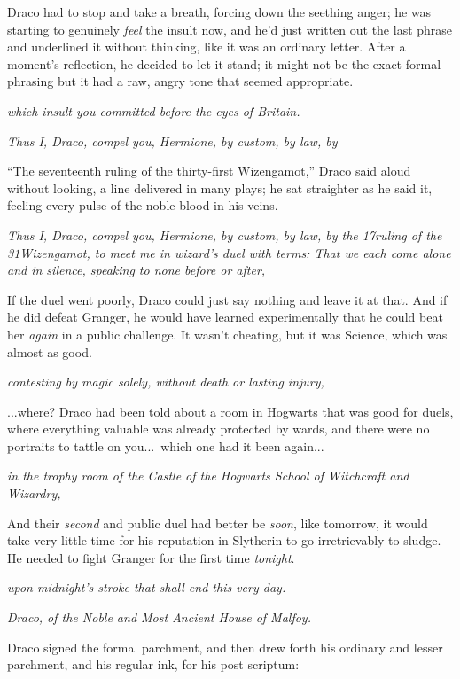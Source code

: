 Draco had to stop and take a breath, forcing down the seething
anger; he was starting to genuinely \emph{feel} the insult now, and
he’d just written out the last phrase and underlined it without
thinking, like it was an ordinary letter. After a moment’s
reflection, he decided to let it stand; it might not be the exact
formal phrasing but it had a raw, angry tone that seemed
appropriate.

\emph{which insult you committed before the eyes of
Britain.}

\emph{Thus I, Draco, compel you, Hermione, by custom, by law,
by}

“The seventeenth ruling of the thirty-first Wizengamot,” Draco
said aloud without looking, a line delivered in many plays; he sat
straighter as he said it, feeling every pulse of the noble blood in
his veins.

\emph{Thus I, Draco, compel you, Hermione, by custom, by law, by
the 17\Th ruling of the 31\St Wizengamot, to meet me in wizard’s duel
with terms: That we each come alone and in silence, speaking to
none before or after,}

If the duel went poorly, Draco could just say nothing and leave
it at that. And if he did defeat Granger, he would have learned
experimentally that he could beat her \emph{again} in a public
challenge. It wasn’t cheating, but it was Science, which was almost
as good.

\emph{contesting by magic solely, without death or lasting
injury,}

...where? Draco had been told about a room in Hogwarts that was
good for duels, where everything valuable was already protected by
wards, and there were no portraits to tattle on you...\ which one
had it been again...

\emph{in the trophy room of the Castle of the Hogwarts School of
Witchcraft and Wizardry,}

And their \emph{second} and public duel had better be
\emph{soon}, like tomorrow, it would take very little time for his
reputation in Slytherin to go irretrievably to sludge. He needed to
fight Granger for the first time \emph{tonight}.

\emph{upon midnight’s stroke that shall end this very day.}

\emph{Draco, of the Noble and Most Ancient House of Malfoy.}

Draco signed the formal parchment, and then drew forth his
ordinary and lesser parchment, and his regular ink, for his post
scriptum:

